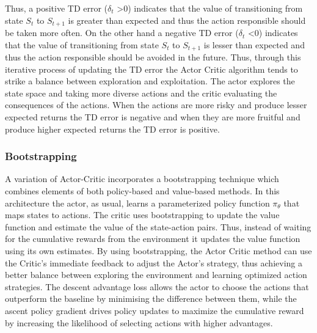 \documentclass{article}
\begin{document}
Thus, a positive TD error ($\delta_{t}$ \textgreater 0) indicates that the value of transitioning from state $S_t$ to $S_{t+1}$ is greater than expected and thus the action responsible should be taken more often. On the other hand a negative TD error ($\delta_{t}$ \textless 0) indicates that the value of transitioning from state $S_t$ to $S_{t+1}$ is lesser than expected and thus the action responsible should be avoided in the future. Thus, through this iterative process of updating the TD error the Actor Critic algorithm tends to strike a balance between exploration and exploitation. The actor explores the state space and taking more diverse actions and the critic evaluating the consequences of the actions. When the actions are more risky and produce lesser expected returns the TD error is negative and when they are more fruitful and produce higher expected returns the TD error is positive.

\subsubsection{Bootstrapping}
\par A variation of Actor-Critic incorporates a bootstrapping technique which combines elements of both policy-based and value-based methods. In this architecture the actor, as usual, learns a parameterized policy function $\pi_\theta$ that maps states to actions. The critic uses bootstrapping to update the value function and estimate the value of the state-action pairs. Thus, instead of waiting for the cumulative rewards from the environment it updates the value function using its own estimates. By using bootstrapping, the Actor Critic method can use the Critic's immediate feedback to adjust the Actor's strategy, thus achieving a better balance between exploring the environment and learning optimized action strategies.
The descent advantage loss allows the actor to choose the actions that outperform the baseline by minimising the difference between them, while the ascent policy gradient drives policy updates to maximize the cumulative reward by increasing the likelihood of selecting actions with higher advantages.
\end{document}
